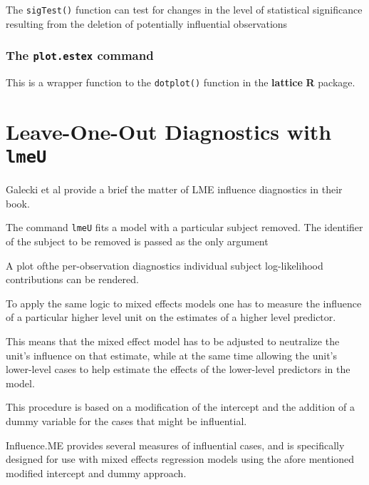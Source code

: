 \documentclass[12pt, a4paper]{article}
\begin{document}
The \texttt{sigTest()} function can test for changes in the level of statistical significance resulting from
the deletion of potentially influential observations


\subsubsection*{The \texttt{plot.estex} command}
This is a wrapper function to the \texttt{dotplot()} function in the \textbf{lattice} \textbf{R} package.



\section{Leave-One-Out Diagnostics with \texttt{lmeU}}
Galecki et al provide a brief the matter of LME influence diagnostics in their book.

The command \texttt{lmeU} fits a model with a particular subject removed. The identifier of the subject to be removed is passed as the only argument

A plot ofthe per-observation diagnostics individual subject log-likelihood contributions can be rendered.

To apply the same logic to mixed effects models one has to measure the influence of a particular higher
level unit on the estimates of a higher level predictor. 

This means that the mixed effect model has to
be adjusted to neutralize the unit’s influence on that estimate, while at the same time allowing the unit’s
lower-level cases to help estimate the effects of the lower-level predictors in the model. 

This procedure is
based on a modification of the intercept and the addition of a dummy variable for the cases that might be
influential. 

Influence.ME provides several measures of influential cases, and is specifically designed for use
with mixed effects regression models using the afore mentioned modified intercept and dummy approach.
\end{document}
